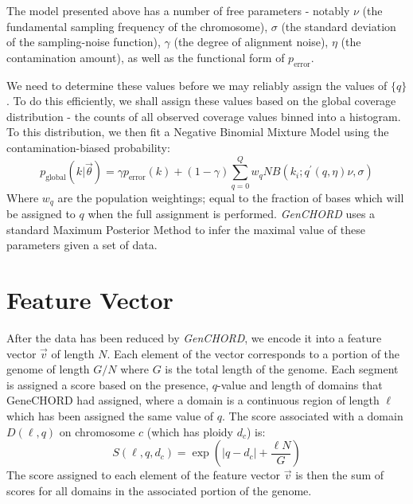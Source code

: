 \documentclass[fleqn,usenatbib]{acmart}
\def\codename{\textit{GenCHORD}}
\begin{document}
{			The model presented above has a number of free parameters - notably $\nu$ (the fundamental sampling frequency of the chromosome), $\sigma$ (the standard deviation of the sampling-noise function), $\gamma$ (the degree of alignment noise), $\eta$ (the contamination amount), as well as the functional form of $p_\text{error}$.

			We need to determine these values before we may reliably assign the values of $\{q\}$. To do this efficiently, we shall assign these values based on the global coverage distribution - the counts of all observed coverage values binned into a histogram. To this distribution, we then fit a Negative Binomial Mixture Model using the contamination-biased probability:
			\begin{equation}
				p_\text{global}(k|\vec{\theta}) = \gamma p_\text{error}(k) + (1-\gamma)\sum_{q=0}^Q w_q NB\left(k_i; q^\prime(q,\eta) \nu, \sigma\right)
			\end{equation}
			Where $w_q$ are the population weightings; equal to the fraction of bases which will be assigned to $q$ when the full assignment is performed. \codename{} uses a standard Maximum Posterior Method to infer the maximal value of these parameters given a set of data.

		\section{Feature Vector}\label{A:Vector}

			After the data has been reduced by \codename{}, we encode it into a feature vector $\vec{v}$ of length $N$. Each element of the vector corresponds to a portion of the genome of length $G/N$ where $G$ is the total length of the genome. Each segment is assigned a score based on the presence, $q$-value and length of domains that GeneCHORD had assigned, where a domain is a continuous region of length $\ell$ which has been assigned the same value of $q$. The score associated with a domain $D(\ell,q)$ on chromosome $c$ (which has ploidy $d_c$) is:
			\begin{equation}
				S(\ell,q,d_c) = \exp\left(|q - d_c| + \frac{\ell N}{G}\right)
			\end{equation}
			The score assigned to each element of the feature vector $\vec{v}$ is then the sum of scores for all domains in the associated portion of the genome.
			

		}
\end{document}
